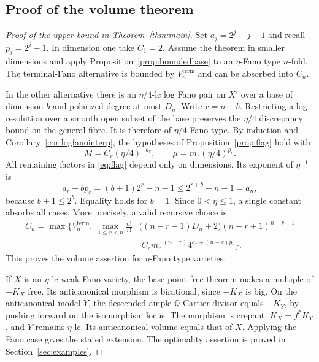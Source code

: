 \documentclass[11pt,reqno]{amsart}
\numberwithin{equation}{section}
\theoremstyle{definition}
\theoremstyle{remark}
\newcommand{\Q}{\mathbb Q}
\begin{document}
\subsection{Proof of the volume theorem}
\begin{proof}[Proof of the upper bound in Theorem~\ref{thm:main}]
Set $a_j=2^j-j-1$ and recall $p_j=2^j-1$. In dimension one take $C_1=2$. Assume the theorem in smaller dimensions and apply Proposition~\ref{prop:boundedbase} to an $\eta$-Fano type $n$-fold. The terminal-Fano alternative is bounded by $V_n^{\mathrm{term}}$ and can be absorbed into $C_n$.

In the other alternative there is an $\eta/4$-lc log Fano pair on $X'$ over a base of dimension $b$ and polarized degree at most $D_n$. Write $r=n-b$. Restricting a log resolution over a smooth open subset of the base preserves the $\eta/4$ discrepancy bound on the general fibre. It is therefore of $\eta/4$-Fano type. By induction and Corollary~\ref{cor:logfanointerp}, the hypotheses of Proposition~\ref{prop:flag} hold with
\[
 M=C_r(\eta/4)^{-a_r},\qquad
 \mu=m_r(\eta/4)^{p_r}.
\]
All remaining factors in \eqref{eq:flag} depend only on dimensions. Its exponent of $\eta^{-1}$ is
\begin{equation}\label{eq:exponents}
 a_r+bp_r=(b+1)2^r-n-1\le2^{r+b}-n-1=a_n,
\end{equation}
because $b+1\le2^b$. Equality holds for $b=1$. Since $0<\eta\le1$, a single constant absorbs all cases. More precisely, a valid recursive choice is
\begin{equation}\label{eq:Cn}
\begin{split}
 C_n=\max\biggl\{V_n^{\mathrm{term}},\ 
 \max_{1\le r<n}\frac{n!}{r!}
 &\bigl((n-r-1)D_n+2\bigr)(n-r+1)^{n-r-1}\\[-2pt]
 &\cdot C_r m_r^{-(n-r)}4^{a_r+(n-r)p_r}\biggr\}.
\end{split}
\end{equation}
This proves the volume assertion for $\eta$-Fano type varieties.

If $X$ is an $\eta$-lc weak Fano variety, the base point free theorem makes a multiple of $-K_X$ free. Its anticanonical morphism is birational, since $-K_X$ is big. On the anticanonical model $Y$, the descended ample $\Q$-Cartier divisor equals $-K_Y$, by pushing forward on the isomorphism locus. The morphism is crepant, $K_X=f^*K_Y$, and $Y$ remains $\eta$-lc. Its anticanonical volume equals that of $X$. Applying the Fano case gives the stated extension. The optimality assertion is proved in Section~\ref{sec:examples}.
\end{proof}
\end{document}
